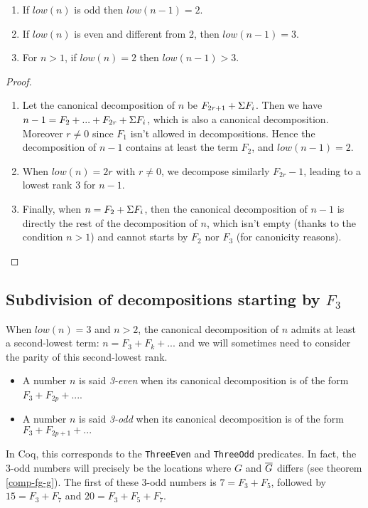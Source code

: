 \documentclass[a4paper,11pt]{article}
\begin{document}
\begin{theorem}\label{fibpred}
\noindent
\begin{enumerate}
\item If $low(n)$ is odd then $low(n-1) = 2$.
\item If $low(n)$ is even and different from 2, then $low(n-1) = 3$.
\item For $n>1$, if $low(n)=2$ then $low(n-1)>3$.
\end{enumerate}
\end{theorem}
\begin{proof}
\noindent
\begin{enumerate}
\item Let the canonical decomposition of $n$ be $F_{2r+1} +
  \Sigma F_i$. Then we have $n-1 = F_2 + ... + F_{2r} + \Sigma F_i$, which
 is also a canonical decomposition. Moreover $r\neq 0$ since $F_1$
 isn't allowed in decompositions. Hence the decomposition of $n-1$
 contains at least the term $F_2$, and $low(n-1)=2$.
\item When $low(n) = 2r$ with $r\neq 0$, we decompose
 similarly $F_{2r}-1$, leading to a lowest rank 3 for $n-1$.
\item Finally, when $n = F_2 + \Sigma F_i$, then the canonical decomposition
  of $n-1$ is directly the rest of the decomposition of $n$, which
  isn't empty (thanks to the condition $n>1$) and
  cannot starts by $F_2$ nor $F_3$ (for canonicity reasons).
\end{enumerate}
\end{proof}

\subsection{Subdivision of decompositions starting by $F_3$}

When $low(n)=3$ and $n>2$, the canonical decomposition of $n$
admits at least a second-lowest term: $n = F_3 + F_k + ...$ and we
will sometimes
need to consider the parity of this second-lowest rank.

\begin{definition}
\noindent
\begin{itemize}
\item A number $n$ is said \emph{3-even} when its canonical decomposition
  is of the form $F_3 + F_{2p} + ...$.
\item A number $n$ is said \emph{3-odd} when its canonical decomposition
  is of the form $F_3 + F_{2p+1} + ...$
\end{itemize}
\end{definition}
In Coq, this corresponds to the {\tt ThreeEven} and {\tt ThreeOdd}
predicates.
In fact, the 3-odd numbers will precisely be the locations where
$G$ and $\overline{G}$ differs (see theorem \ref{comp-fg-g}). The first of these 3-odd numbers is
$7 = F_3+F_5$, followed by $15 = F_3 + F_7$ and $20 = F_3+F_5+F_7$.
\end{document}
